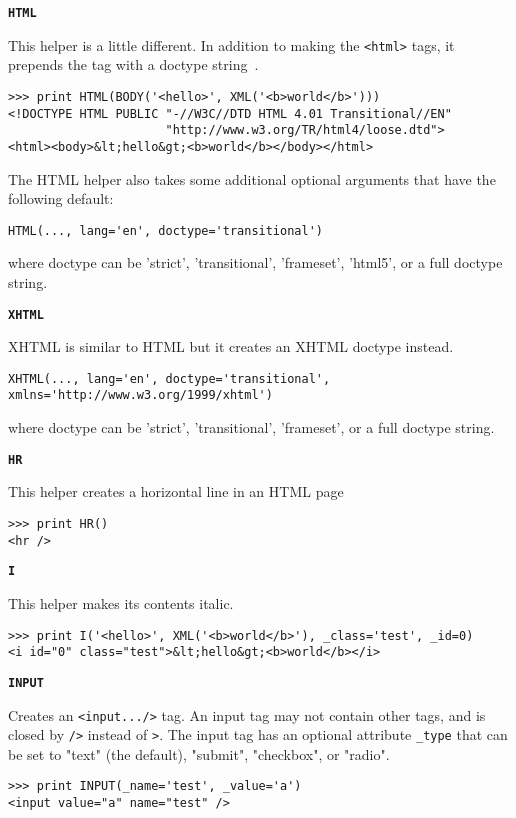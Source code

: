 \documentclass[justified,sixbynine,notoc]{tufte-book}
\def\ft{\small\tt}
\def\inxx#1{\index{#1}}
\begin{document}
\begin{fullwidth}
{\bf {\ft HTML}}

\inxx{HTML} \inxx{XHTML}

This helper is a little different. In addition to making the {\ft <html>} tags,
it prepends the tag with a doctype string~\cite{xhtml-w,xhtml-o,xhtml-school}.
\begin{lstlisting}
>>> print HTML(BODY('<hello>', XML('<b>world</b>')))
<!DOCTYPE HTML PUBLIC "-//W3C//DTD HTML 4.01 Transitional//EN"
                      "http://www.w3.org/TR/html4/loose.dtd">
<html><body>&lt;hello&gt;<b>world</b></body></html>
\end{lstlisting}

The HTML helper also takes some additional optional arguments that have the following default:
\begin{lstlisting}
HTML(..., lang='en', doctype='transitional')
\end{lstlisting}
\noindent where doctype can be 'strict', 'transitional', 'frameset', 'html5', or a full doctype string.

{\bf {\ft XHTML}}

\inxx{XHTML}

XHTML is similar to HTML but it creates an XHTML doctype instead.
\begin{lstlisting}
XHTML(..., lang='en', doctype='transitional', xmlns='http://www.w3.org/1999/xhtml')
\end{lstlisting}
\noindent where doctype can be 'strict', 'transitional', 'frameset', or a full doctype string.

{\bf {\ft HR}}

\inxx{HR}

This helper creates a horizontal line in an HTML page
\begin{lstlisting}
>>> print HR()
<hr />
\end{lstlisting}

{\bf {\ft I}}

\inxx{I}

This helper makes its contents italic.
\begin{lstlisting}
>>> print I('<hello>', XML('<b>world</b>'), _class='test', _id=0)
<i id="0" class="test">&lt;hello&gt;<b>world</b></i>
\end{lstlisting}

{\bf {\ft INPUT}}

\inxx{INPUT}

Creates an {\ft <input.../>} tag. An input tag may not contain other tags, and is closed by {\ft />} instead of {\ft >}. The input tag has an optional attribute {\ft \_type} that can be set to "text" (the default), "submit", "checkbox", or "radio".
\begin{lstlisting}
>>> print INPUT(_name='test', _value='a')
<input value="a" name="test" />
\end{lstlisting}


\end{fullwidth}
\end{document}
